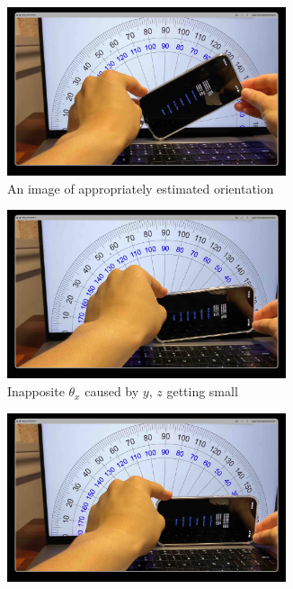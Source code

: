 \documentclass{article}
\begin{document}
\FloatBarrier
\begin{figure}[h]
    \begin{subfigure}{0.5\textwidth}
        \centering
        \includegraphics[width=0.9\textwidth]{Images/2_1_3_1.jpg}
        \caption{An image of appropriately estimated orientation}
        \label{fig:2_1_3_1}
    \end{subfigure}
    \begin{subfigure}{0.5\textwidth}
        \centering
        \includegraphics[width=0.9\textwidth]{Images/2_1_3_2.jpg}
        \caption{Inapposite $\theta_x$ caused by $y$, $z$ getting small}
        \label{fig:2_1_3_2}
    \end{subfigure}
    \begin{subfigure}{0.5\textwidth}
        \centering
        \includegraphics[width=0.9\textwidth]{Images/2_1_3_3.jpg}

\end{subfigure}
\end{figure}
\end{document}
